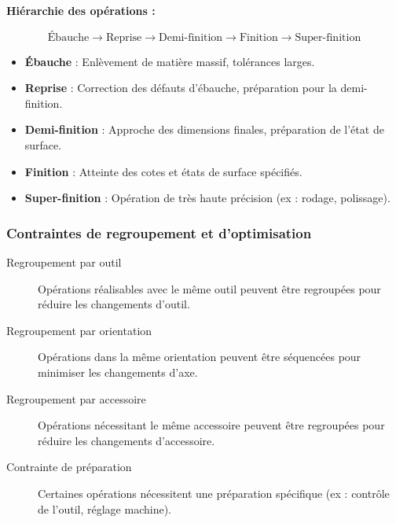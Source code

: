 \documentclass{article}
\begin{document}
\begin{center}
\begin{tcolorbox}[colback=gray!5!white, colframe=gray!75!black, width=0.8\textwidth]
\textbf{Hiérarchie des opérations :}
\vspace{0.5em}

\[
\text{Ébauche} \rightarrow \text{Reprise} \rightarrow \text{Demi-finition} \rightarrow \text{Finition} \rightarrow \text{Super-finition}
\]
\end{tcolorbox}
\end{center}

\begin{itemize}
    \item \textbf{Ébauche} : Enlèvement de matière massif, tolérances larges.
    \item \textbf{Reprise} : Correction des défauts d'ébauche, préparation pour la demi-finition.
    \item \textbf{Demi-finition} : Approche des dimensions finales, préparation de l'état de surface.
    \item \textbf{Finition} : Atteinte des cotes et états de surface spécifiés.
    \item \textbf{Super-finition} : Opération de très haute précision (ex : rodage, polissage).
\end{itemize}

\subsubsection{Contraintes de regroupement et d'optimisation}

\begin{description}
    \item[Regroupement par outil] Opérations réalisables avec le même outil peuvent être regroupées pour réduire les changements d'outil.
    
    \item[Regroupement par orientation] Opérations dans la même orientation peuvent être séquencées pour minimiser les changements d'axe.
    
    \item[Regroupement par accessoire] Opérations nécessitant le même accessoire peuvent être regroupées pour réduire les changements d'accessoire.
    
    \item[Contrainte de préparation] Certaines opérations nécessitent une préparation spécifique (ex : contrôle de l'outil, réglage machine).
\end{description}
\end{document}
